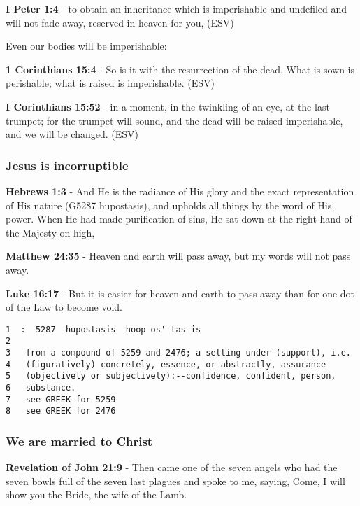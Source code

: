 \documentclass[11pt]{article}
\begin{document}
\textbf{I Peter 1:4} - to obtain an inheritance which is imperishable and undefiled and will not fade away, reserved in heaven for you, (ESV)

Even our bodies will be imperishable:

\textbf{1 Corinthians 15:4} -  So is it with the resurrection of the dead.  What is sown is perishable; what is raised is imperishable. (ESV)

\textbf{I Corinthians 15:52} - in a moment, in the twinkling of an eye, at the last trumpet; for the trumpet will sound, and the dead will be raised imperishable, and we will be changed. (ESV)

\subsubsection{Jesus is incorruptible}
\label{sec:orgb2f6dfd}
\textbf{Hebrews 1:3} - And He is the radiance of His glory and the exact representation of His nature (G5287 hupostasis), and upholds all things by the word of His power. When He had made purification of sins, He sat down at the right hand of the Majesty on high,

\textbf{Matthew 24:35} - Heaven and earth will pass away, but my words will not pass away.

\textbf{Luke 16:17} - But it is easier for heaven and earth to pass away than for one dot of the Law to become void.

\begin{verbatim}
1  :  5287  hupostasis  hoop-os'-tas-is
2  
3   from a compound of 5259 and 2476; a setting under (support), i.e.
4   (figuratively) concretely, essence, or abstractly, assurance
5   (objectively or subjectively):--confidence, confident, person,
6   substance.
7   see GREEK for 5259
8   see GREEK for 2476
\end{verbatim}

\subsubsection{We are married to Christ}
\label{sec:orgeb8eb15}
\textbf{Revelation of John 21:9} - Then came one of the seven angels who had the seven bowls full of the seven last plagues and spoke to me, saying, Come, I will show you the Bride, the wife of the Lamb.
\end{document}
